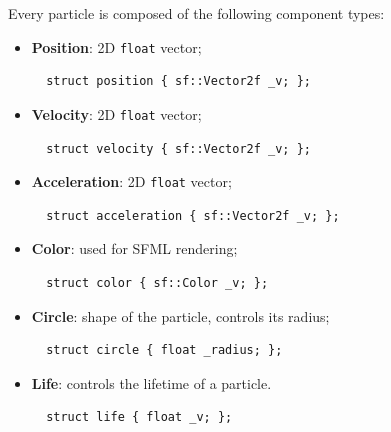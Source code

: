 \documentclass[twoside, 12pt, a4paper, openany]{book}
\begin{document}
Every particle is composed of the following component types:

\begin{itemize}
\item
  \textbf{Position}: 2D
  \texttt{float}
  vector;

  \begin{verbatim}
  struct position { sf::Vector2f _v; };
  \end{verbatim}
\item
  \textbf{Velocity}: 2D
  \texttt{float}
  vector;

  \begin{verbatim}
  struct velocity { sf::Vector2f _v; };
  \end{verbatim}
\item
  \textbf{Acceleration}: 2D
  \texttt{float}
  vector;

  \begin{verbatim}
  struct acceleration { sf::Vector2f _v; };
  \end{verbatim}
\item
  \textbf{Color}: used for SFML rendering;

  \begin{verbatim}
  struct color { sf::Color _v; };
  \end{verbatim}
\item
  \textbf{Circle}: shape of the particle, controls its radius;

  \begin{verbatim}
  struct circle { float _radius; };
  \end{verbatim}
\item
  \textbf{Life}: controls the lifetime of a particle.

  \begin{verbatim}
  struct life { float _v; };
  \end{verbatim}
\end{itemize}
\end{document}
